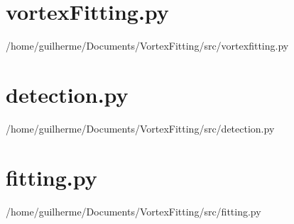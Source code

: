 \documentclass[12pt, a4paper, openany]{memoir}
\begin{document}
\section{vortexFitting.py}


{/home/guilherme/Documents/VortexFitting/src/vortexfitting.py}

\section{detection.py}


{/home/guilherme/Documents/VortexFitting/src/detection.py}

\section{fitting.py}


{/home/guilherme/Documents/VortexFitting/src/fitting.py}
\end{document}
